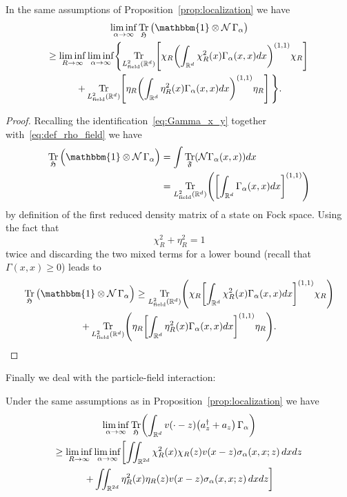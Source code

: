 \documentclass[AHL,Unicode,longabstracts,published]{cedram}
\DeclareMathOperator{\Tr}{Tr}
\DeclareMathOperator{\field}{field}
\newcommand{\R}{\mathbb{R}}
\newcommand{\cN}{\mathcal{N}}
\newcommand{\gH}{\mathfrak{H}}
\newcommand{\gF}{\mathfrak{F}}
\newcommand{\1}{\mathds{1}}
\renewcommand*{\to}{\mathchoice{\longrightarrow}{\rightarrow}{\rightarrow}{\rightarrow}}
\let\originalleft\left
\let\originalright\right
\renewcommand{\left}{\mathopen{}\mathclose\bgroup\originalleft}
\renewcommand{\right}{\aftergroup\egroup\originalright}
\begin{document}
\begin{lemm}\label{lemma:field_localization}
In the same assumptions of Proposition~\ref{prop:localization} we have
\begin{multline}\label{eq:splitting_field}
\liminf_{\alpha\to\infty} \Tr_{ \gH}\big(\mathbbm{1}\otimes \cN\,\Gamma_\alpha\big)\\
\geq \liminf_{R \to\infty} \liminf_{\alpha\to\infty}
\left\{
\Tr_{L^2_{\field}(\R^d)}\left[\chi_R\left(\int_{\R^d} \chi_R^2(x) \Gamma_\alpha(x,x) dx\right)^{(1,1)}\chi_R\right]\right.\\
\left.+\Tr_{L^2_{\field}(\R^d)}\left[\eta_R\left(\int_{\R^d} \eta_R^2(x) \Gamma_\alpha(x,x) dx\right)^{(1,1)}\eta_R\right]\,
\right\}.
\end{multline}
\end{lemm}

\begin{proof}
Recalling the identification~\eqref{eq:Gamma_x_y} together with~\eqref{eq:def_rho_field} we have
\begin{align*}
\Tr_{ \gH}\Big(\mathbbm{1}\otimes \cN\,\Gamma_\alpha\Big)&= \int \Tr_{\gF} \left(\cN \Gamma_\alpha (x,x)\right) dx\\
&= \Tr_{L^2_{\field}(\R^d)}\left(\left[\int_{\R^d} \Gamma_\alpha(x,x)dx\right]^{(1,1)}\right)
\end{align*}
by definition of the first reduced density matrix of a state on Fock space. Using the fact that
\[
\chi_R^2+\eta_R^2=1
\]
twice and discarding the two mixed terms for a lower bound (recall that $\Gamma(x,x)\ge0$) leads to
\begin{multline*}
\Tr_{ \gH}\big(\mathbbm{1}\otimes \cN\,\Gamma_\alpha\Big) \ge \Tr_{L^2_{\field}(\R^d)}\left(\chi_R \left[\int_{\R^d}\chi_R^2(x) \Gamma_\alpha(x,x)dx\right]^{(1,1)}\chi_R\right)\\
+\Tr_{L^2_{\field}(\R^d)}\left(\eta_R \left[\int_{\R^d}\eta_R^2(x) \Gamma_\alpha(x,x)dx\right]^{(1,1)}\eta_R\right).\qedhere
\end{multline*}
\end{proof}

Finally we deal with the particle-field interaction:

\begin{lemm}\label{lemma:interaction_localization}
Under the same assumptions as in Proposition~\ref{prop:localization} we have
\begin{multline}\label{eq:splitting_interaction}
\liminf_{\alpha\to\infty} \Tr_{ \gH}\left(\int_{\R^d}v(\cdot-z) \left(a^\dagger_z + a_z\right) \,\Gamma_\alpha\right)\\
\ge \liminf_{R \to\infty} \liminf_{\alpha\to\infty}
\left[
\iint_{\R^{2d}} \chi_R^2(x)\chi_R(z) v(x-z) \sigma_\alpha(x,x;z)\, dxdz\right.\\
\left. +\iint_{\R^{2d}} \eta_R^2(x)\eta_R(z) v(x-z) \sigma_\alpha(x,x;z)\, dxdz
\right]
\end{multline}
\end{lemm}
\end{document}
